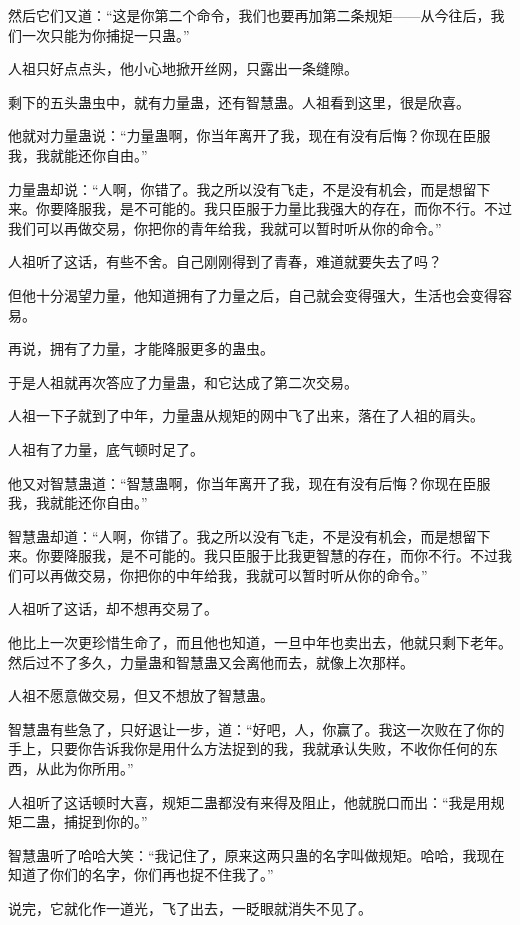 \begin{this_body}
然后它们又道：“这是你第二个命令，我们也要再加第二条规矩——从今往后，我们一次只能为你捕捉一只蛊。”

人祖只好点点头，他小心地掀开丝网，只露出一条缝隙。

剩下的五头蛊虫中，就有力量蛊，还有智慧蛊。人祖看到这里，很是欣喜。

他就对力量蛊说：“力量蛊啊，你当年离开了我，现在有没有后悔？你现在臣服我，我就能还你自由。”

力量蛊却说：“人啊，你错了。我之所以没有飞走，不是没有机会，而是想留下来。你要降服我，是不可能的。我只臣服于力量比我强大的存在，而你不行。不过我们可以再做交易，你把你的青年给我，我就可以暂时听从你的命令。”

人祖听了这话，有些不舍。自己刚刚得到了青春，难道就要失去了吗？

但他十分渴望力量，他知道拥有了力量之后，自己就会变得强大，生活也会变得容易。

再说，拥有了力量，才能降服更多的蛊虫。

于是人祖就再次答应了力量蛊，和它达成了第二次交易。

人祖一下子就到了中年，力量蛊从规矩的网中飞了出来，落在了人祖的肩头。

人祖有了力量，底气顿时足了。

他又对智慧蛊道：“智慧蛊啊，你当年离开了我，现在有没有后悔？你现在臣服我，我就能还你自由。”

智慧蛊却道：“人啊，你错了。我之所以没有飞走，不是没有机会，而是想留下来。你要降服我，是不可能的。我只臣服于比我更智慧的存在，而你不行。不过我们可以再做交易，你把你的中年给我，我就可以暂时听从你的命令。”

人祖听了这话，却不想再交易了。

他比上一次更珍惜生命了，而且他也知道，一旦中年也卖出去，他就只剩下老年。然后过不了多久，力量蛊和智慧蛊又会离他而去，就像上次那样。

人祖不愿意做交易，但又不想放了智慧蛊。

智慧蛊有些急了，只好退让一步，道：“好吧，人，你赢了。我这一次败在了你的手上，只要你告诉我你是用什么方法捉到的我，我就承认失败，不收你任何的东西，从此为你所用。”

人祖听了这话顿时大喜，规矩二蛊都没有来得及阻止，他就脱口而出：“我是用规矩二蛊，捕捉到你的。”

智慧蛊听了哈哈大笑：“我记住了，原来这两只蛊的名字叫做规矩。哈哈，我现在知道了你们的名字，你们再也捉不住我了。”

说完，它就化作一道光，飞了出去，一眨眼就消失不见了。


\end{this_body}
